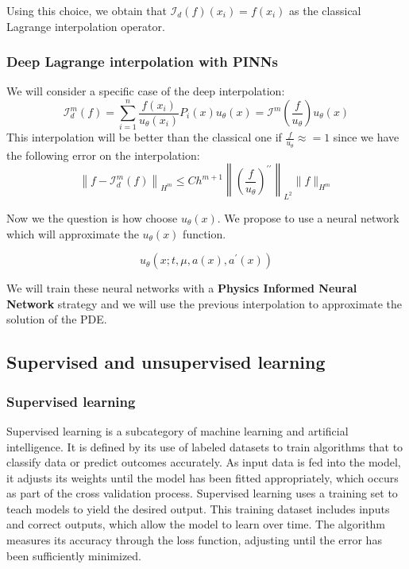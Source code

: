 \documentclass{article}
\begin{document}
Using this choice, we obtain that $\mathcal{I}_d(f)\left(x_i\right)=f\left(x_i\right)$ as the classical Lagrange interpolation operator. 

\subsubsection{Deep Lagrange interpolation with PINNs}

We will consider a specific case of the deep interpolation:
$$
\mathcal{I}_d^m(f)=\sum_{i=1}^n \frac{f\left(x_i\right)}{u_\theta\left(x_i\right)} P_i(x) u_\theta(x)=\mathcal{I}^m\left(\frac{f}{u_\theta}\right) u_\theta(x)
$$
This interpolation will be better than the classical one if $\frac{f}{u_\theta} \approx=1$ since we have the following error on the interpolation:
$$
\left\|f-\mathcal{I}_d^m(f)\right\|_{H^m} \leq C h^{m+1}\left\|\left(\frac{f}{u_\theta}\right)^{\prime \prime}\right\|_{L^2}\|f\|_{H^m}
$$

Now we the question is how choose $u_\theta(x)$. We propose to use a neural network which will approximate the $u_\theta(x)$ function. 

$$
u_\theta\left(x ; t, \mu, a(x), a^{\prime}(x)\right)
$$

We will train these neural networks with a \textbf{Physics Informed Neural Network} strategy and we will use the previous interpolation to approximate the solution of the PDE.

\subsection{Supervised and unsupervised learning}

\subsubsection{Supervised learning}

Supervised learning is a subcategory of machine learning and artificial intelligence. 
It is defined by its use of labeled datasets to train algorithms that to classify data or predict outcomes accurately. As input data is fed into the model, 
it adjusts its weights until the model has been fitted appropriately, which occurs as part of the cross validation process. Supervised learning uses a training set to teach models to yield the desired output. This training dataset includes inputs and correct outputs, which allow the model to learn over time. The algorithm measures its accuracy through the loss function, 
adjusting until the error has been sufficiently minimized. 
\end{document}
